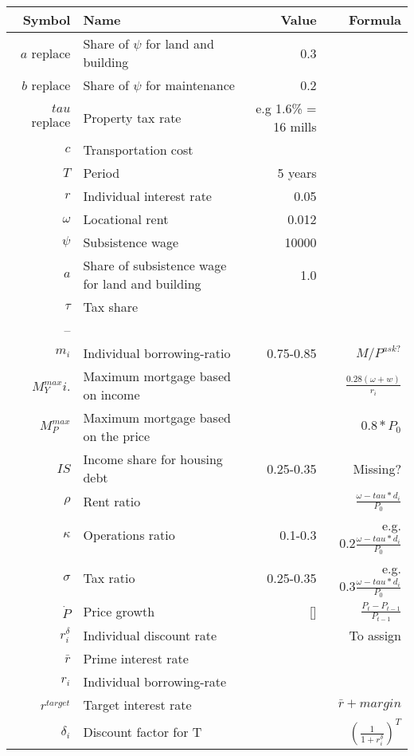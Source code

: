\renewcommand{\arraystretch}{1.5}
\begin{tabular}{rlrr}\
Symbol         & Name                                 & Value      & Formula  \\ \hline
$a$ replace    & Share of $\psi$ for land and building &   0.3         & \\
$b$ replace    & Share of $\psi$ for maintenance       &   0.2         & \\
$tau$ replace  & Property tax rate &  e.g 1.6\% = 16 mills             & \\
$c$       & Transportation cost & \\
$T$       & Period & 5 years      \\
$r$       & Individual interest rate & 0.05 \\
$\omega$  & Locational rent & 0.012  \\
$\psi$    & Subsistence wage & 10000 \\
$a$       & Share of subsistence wage for land and building & 1.0 \\
$\tau$       & Tax share & \\

--        &  & \\
$m_i$          & Individual borrowing-ratio           & 0.75-0.85  & $M/P^{ask?}$ \\
$M^{max}_Yi$.  & Maximum mortgage based on income     &            & $\frac{0.28(\omega+w)}{r_i}$ \\
 $M^{max}_P$   & Maximum mortgage based on the price  &            & $0.8*P_0$ \\
$IS$           & Income share for housing debt        & 0.25-0.35  & Missing? \\
$\rho$         & Rent ratio                           &            & $\frac{\omega-tau*d_i}{P_0}$ \\
$\kappa $      & Operations ratio                     & 0.1-0.3    & e.g. $ 0.2\frac{\omega-tau*d_i}{P_0}$ \\
$\sigma$       & Tax ratio                            & 0.25-0.35  & e.g. $ 0.3\frac{\omega-tau*d_i}{P_0}$ \\
$\dot P $      & Price growth                         & []         & $\frac{P_t-P_{t-1}}{P_{t-1}}$\\
$r_i^\delta$   & Individual discount rate             &            & To assign \\
$\bar r$       & Prime interest rate                  &            & \\
$r_i$          & Individual borrowing-rate            &            & \\
$r^{target}$   & Target interest rate                 &            & $\bar r + margin$ \\
$\delta_i$     & Discount factor for T                &            & $\left(\frac{1}{1+r_i^\delta}\right)^T$ \\


\end{tabular}
\renewcommand{\arraystretch}{1.0}




